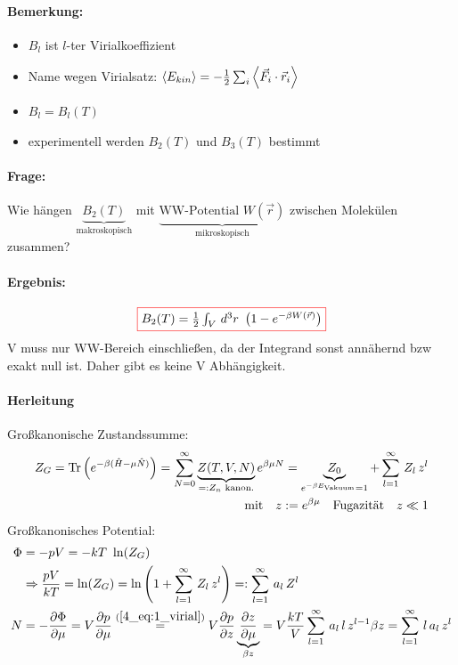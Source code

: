 \paragraph{Bemerkung:}
\begin{itemize}
    \item $B_l$ ist $l$-ter Virialkoeffizient
    \item Name wegen Virialsatz: $\expval{E_{kin}} = - \frac{1}{2} \sum_i \expval{\Vec{F}_i\cdot \Vec{r}_i}$
    \item $B_l = B_l(T)$
    \item experimentell werden $B_2(T)$ und $B_3(T)$ bestimmt
\end{itemize}

\paragraph{Frage:} Wie hängen $\underbrace{B_2(T)}_{\text{makroskopisch}}$ mit $\underbrace{\text{WW-Potential } W(\Vec{r})}_{\text{mikroskopisch}}$ zwischen Molekülen zusammen?

\paragraph{Ergebnis:}
\begin{equation}
    \fcolorbox{red}{white}{$B_2(T) = \frac{1}{2} \int_V \, d^3r \ \left(1-e^{-\beta W(\Vec{r})}\right)$}
\end{equation}
\color{black!40} V muss nur WW-Bereich einschließen, da der Integrand sonst annähernd bzw exakt null ist. Daher gibt es keine V Abhängigkeit. \color{black}
\paragraph{Herleitung}
Großkanonische Zustandssumme:
\begin{align}
    Z_G = \Tr\left(e^{-\beta(\hat{H}-\mu \hat{N})}\right) = \sum_{N=0}^{\infty}\underbrace{Z(T,V,N)}_{=: Z_n \text{ kanon.}} e^{\beta\mu N} = \underbrace{Z_0}_{e^{-\beta E_{\text{\tiny Vakuum}}}=1 }+ \sum_{l=1}^{\infty} \, Z_l \, z^l \\
    \qq{mit} z := e^{\beta \mu} \qq{Fugazität} z \ll 1    
\end{align}
Großkanonisches Potential:
\begin{align}
    \Phi &= -pV = -kT \ \ln(Z_G) \\
    &\Rightarrow \frac{pV}{kT} = \ln(Z_G) = \ln\left(1 + \sum_{l=1}^{\infty}\, Z_l \, z^l\right) =: \sum_{l=1}^{\infty}\, a_l \, Z^l \label{4_eq:1_virial} \\
    N &= -\pdv{\Phi}{\mu} = V \pdv{p}{\mu} \stackrel{(\ref{4_eq:1_virial})}{=} V \pdv{p}{z} \underbrace{\pdv{z}{\mu}}_{\beta z} = V \frac{kT}{V} \sum_{l=1}^{\infty} \, a_l \, l \, z^{l-1} \beta z = \sum_{l=1}^{\infty} \, l\,a_l \, z^l \label{4_eq:2_virial}
\end{align}

